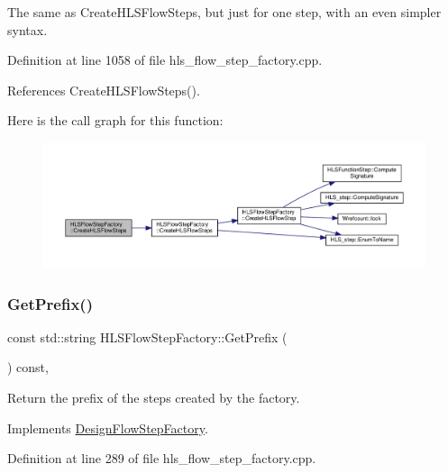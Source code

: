 The same as Create\+H\+L\+S\+Flow\+Steps, but just for one step, with an even simpler syntax. 



Definition at line 1058 of file hls\+\_\+flow\+\_\+step\+\_\+factory.\+cpp.



References Create\+H\+L\+S\+Flow\+Steps().

Here is the call graph for this function\+:
\nopagebreak
\begin{figure}[H]
\begin{center}
\leavevmode
\includegraphics[width=350pt]{dd/d39/classHLSFlowStepFactory_a5ee886e0907aa696026b6b222ac3507f_cgraph}
\end{center}
\end{figure}
\mbox{\label{classHLSFlowStepFactory_a84c60dc2d5dfbeccd7c631861a5bb93f}} 
\subsubsection{\texorpdfstring{Get\+Prefix()}{GetPrefix()}}
{\footnotesize\ttfamily const std\+::string H\+L\+S\+Flow\+Step\+Factory\+::\+Get\+Prefix (\begin{DoxyParamCaption}{ }\end{DoxyParamCaption}) const\hspace{0.3cm}{\ttfamily [override]}, {\ttfamily [virtual]}}



Return the prefix of the steps created by the factory. 



Implements \hyperlink{classDesignFlowStepFactory_a52abfc00c170b5a63e84431b75eb698e}{Design\+Flow\+Step\+Factory}.



Definition at line 289 of file hls\+\_\+flow\+\_\+step\+\_\+factory.\+cpp.



